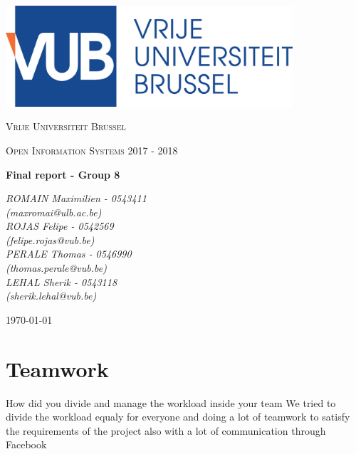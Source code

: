 \documentclass[a4paper,12pt]{article}
\begin{document}
\begin{titlepage}
    \centering
    \includegraphics[width=0.8\textwidth]{logo.eps}\par\vspace{1cm}
    {\scshape\LARGE Vrije Universiteit Brussel\par}
    \vspace{1cm}
    {\scshape\Large Open Information Systems 2017 - 2018\par}
    \vspace{1.5cm}
    {\huge\bfseries Final report - Group 8\par}
    \vspace{2cm}
    {\Large\itshape ROMAIN Maximilien - 0543411\\ (maxromai@ulb.ac.be)\\ ROJAS Felipe - 0542569\\ (felipe.rojas@vub.be)\\PERALE Thomas - 0546990\\ (thomas.perale@vub.be)\\ LEHAL Sherik - 0543118\\ (sherik.lehal@vub.be)\par}
    \vfill

    {\large \today\par}
\end{titlepage}

\newpage


\section{Teamwork}
How did you divide and manage the workload inside your team
We tried to divide the workload equaly for everyone and doing a lot of teamwork to satisfy the requirements of the project also with a lot of communication through Facebook
\end{document}
